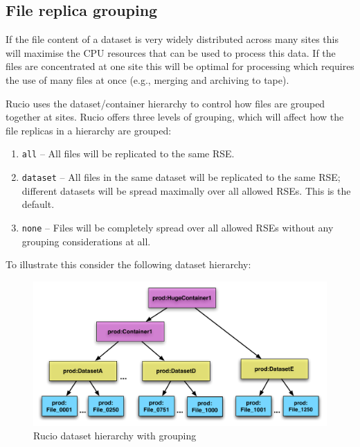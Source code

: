 \documentclass{atlasnote}
\begin{document}
\subsection{File replica grouping}
\label{sec:file-replica-grouping}

If the file content of a dataset is very widely distributed across many sites this will maximise the CPU resources that can be used to process this data. If the files are concentrated at one site this will be optimal for processing which requires the use of many files at once (e.g., merging and archiving to tape).

Rucio uses the dataset/container hierarchy to control how files are grouped together at sites. Rucio offers three levels of grouping, which will affect how the file replicas in a hierarchy are grouped:
\begin{enumerate}
\item[] \texttt{all} -- All files will be replicated to the same RSE.
\item[] \texttt{dataset} -- All files in the same dataset will be replicated to the same RSE; different datasets will be spread maximally over all allowed RSEs. This is the default.
\item[] \texttt{none} -- Files will be completely spread over all allowed RSEs without any grouping considerations at all.
\end{enumerate}

To illustrate this consider the following dataset hierarchy:

\begin{figure}[h]
\begin{center}
\includegraphics[width=400pt]{dataset_hierarchy.pdf}
\end{center}
\caption{\label{datasethierarchy} Rucio dataset hierarchy with grouping}
\end{figure}
\end{document}
